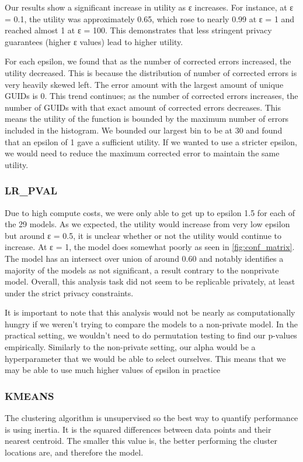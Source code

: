 \documentclass[12pt,letterpaper]{article}
\begin{document}
Our results show a significant increase in utility as ε increases. For instance, at ε = 0.1, the utility was approximately 0.65, which rose to nearly 0.99 at ε = 1 and reached almost 1 at ε = 100. This demonstrates that less stringent privacy guarantees (higher ε values) lead to higher utility.

For each epsilon, we found that as the number of corrected errors increased, the utility decreased. This is because the distribution of number of corrected errors is very heavily skewed left. The error amount with the largest amount of unique GUIDs is 0. This trend continues; as the number of corrected errors increases, the number of GUIDs with that exact amount of corrected errors decreases. This means the utility of the function is bounded by the maximum number of errors included in the histogram. We bounded our largest bin to be at 30 and found that an epsilon of 1 gave a sufficient utility. If we wanted to use a stricter epsilon, we would need to reduce the maximum corrected error to maintain the same utility. 


\subsubsection{LR\_PVAL}
Due to high compute costs, we were only able to get up to epsilon 1.5 for each of the 29 models. As we expected, the utility would increase from very low epsilon but around ε = 0.5, it is unclear whether or not the utility would continue to increase. At ε = 1, the model does somewhat poorly as seen in \ref{fig:conf_matrix}. The model has an intersect over union of around 0.60 and notably identifies a majority of the models as not significant, a result contrary to the nonprivate model. Overall, this analysis task did not seem to be replicable privately, at least under the strict privacy constraints.

It is important to note that this analysis would not be nearly as computationally hungry if we weren't trying to compare the models to a non-private model. In the practical setting, we wouldn't need to do permutation testing to find our p-values empirically. Similarly to the non-private setting, our alpha would be a hyperparameter that we would be able to select ourselves. This means that we may be able to use much higher values of epsilon in practice

\subsubsection{KMEANS}
The clustering algorithm is unsupervised so the best way to quantify performance is using inertia. It is the squared differences between data points and their nearest centroid. The smaller this value is, the better performing the cluster locations are, and therefore the model. 
\end{document}
